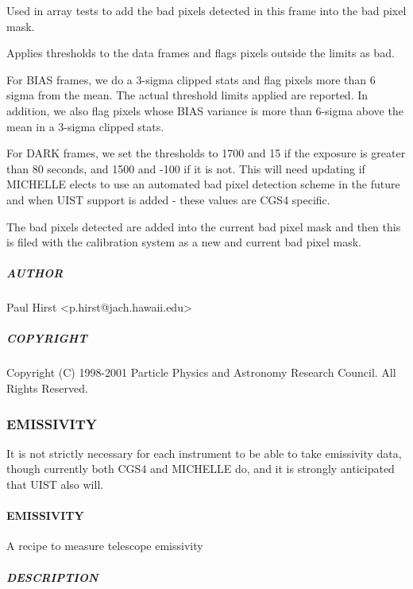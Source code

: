 \documentclass[twoside,11pt]{article}
\renewcommand{\_}{\texttt{\symbol{95}}}
\begin{document}
Used in array tests to add the bad pixels detected in this frame into the 
bad pixel mask.



Applies thresholds to the data frames and flags pixels outside
the limits as bad.



For BIAS frames, we do a 3-sigma clipped stats and flag pixels more
than 6 sigma from the mean. The actual threshold limits applied are
reported. In addition, we also flag pixels whose BIAS variance is more
than 6-sigma above the mean in a 3-sigma clipped stats.



For DARK frames, we set the thresholds to 1700 and 15 if the exposure
is greater than 80 seconds, and 1500 and -100 if it is not. This will
need updating if MICHELLE elects to use an automated bad pixel
detection scheme in the future and when UIST support is added - these
values are CGS4 specific.



The bad pixels detected are added into the current bad pixel mask and
then this is filed with the calibration system as a new and current
bad pixel mask.

\subparagraph*{AUTHOR\label{_FIND_BAD_PIXELS__AUTHOR}}

Paul Hirst <p.hirst@jach.hawaii.edu>

\subparagraph*{COPYRIGHT\label{_FIND_BAD_PIXELS__COPYRIGHT}}

Copyright (C) 1998-2001 Particle Physics and Astronomy Research
Council. All Rights Reserved.


\subsubsection{EMISSIVITY}

It is not strictly necessary for each instrument to be able to take
emissivity data, though currently both CGS4 and MICHELLE do, and it is
strongly anticipated that UIST also will.

\paragraph*{EMISSIVITY\label{EMISSIVITY}}

A recipe to measure telescope emissivity

\subparagraph*{DESCRIPTION\label{EMISSIVITY_DESCRIPTION}}
\end{document}
